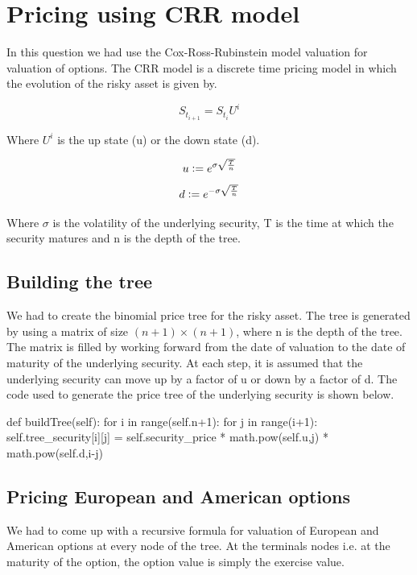 \documentclass[12pt]{report}
\newcommand{\defeq}{\vcentcolon=}
\begin{document}
\chapter*{Pricing using CRR model}

In this question we had use the Cox-Ross-Rubinstein model valuation for valuation of options. The CRR model is a discrete time pricing model in which the evolution of the risky asset is given by.

\begin{equation*}
	S_{t_{i+1}} = S_{t_{i}}U^{i}
\end{equation*}	

Where $U^i$ is the up state (u) or the down state (d).

\begin{equation*}
	u \defeq e^{\sigma \sqrt{\frac{T}{n}} }
\end{equation*}
\begin{equation*}
	d \defeq e^{-\sigma \sqrt{\frac{T}{n}} }
\end{equation*}

Where $\sigma$ is the volatility of the underlying security, T is the time at which the security matures and n is the depth of the tree. 

\section*{Building the tree}
We had to create the binomial price tree for the risky asset. The tree is generated by using a matrix of size $(n+1) \times (n+1)$, where n is the depth of the tree. The matrix is filled by working forward from the date of valuation to the date of maturity of the underlying security. At each step, it is assumed that the underlying security can move up by a factor of u or down by a factor of d. The code used to generate the price tree of the underlying security is shown below.
\linebreak
\begin{tiny}
\begin{python}
def buildTree(self):
 for i in range(self.n+1):
   for j in range(i+1):
     self.tree_security[i][j] = self.security_price * math.pow(self.u,j) * math.pow(self.d,i-j)
	\end{python}	
\end{tiny}

\section*{Pricing European and American options}
We had to come up with a recursive formula for valuation of European and American options at every node of the tree. At the terminals nodes i.e. at the maturity of the option, the option value is simply the exercise value. 
\end{document}
